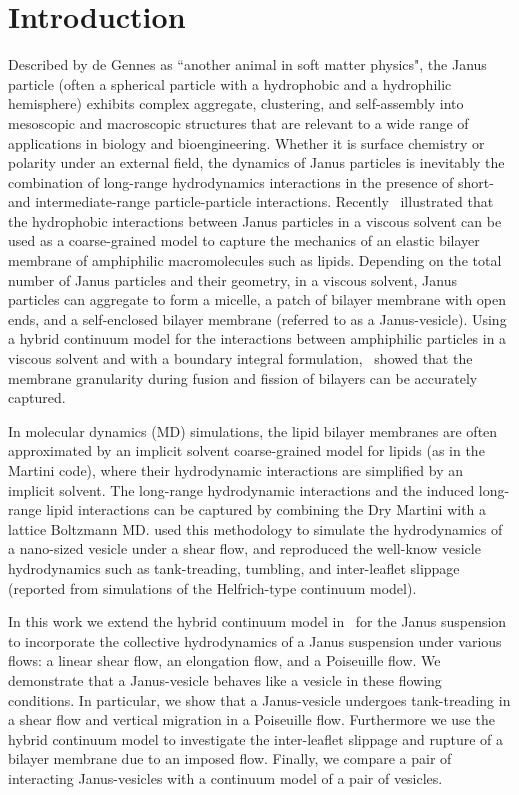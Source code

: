 \documentclass[lineno]{jfm}
\begin{document}
\section{\label{intro}Introduction}
Described by de Gennes as ``another animal in soft matter physics", the
Janus particle (often a spherical particle with a hydrophobic and a
hydrophilic hemisphere) exhibits complex aggregate, clustering, and
self-assembly into mesoscopic and macroscopic structures that are
relevant to a wide range of applications in biology and bioengineering.
Whether it is surface chemistry or polarity under an external field, the
dynamics of Janus particles is inevitably the combination of long-range
hydrodynamics interactions in the presence of short- and
intermediate-range particle-particle interactions. Recently~\cite{Fu20}
illustrated that the hydrophobic interactions between Janus particles in
a viscous solvent can be used as a coarse-grained model to capture the
mechanics of an elastic bilayer membrane of amphiphilic macromolecules
such as lipids. Depending on the total number of Janus particles and
their geometry, in a viscous solvent, Janus particles can aggregate to
form a micelle, a patch of bilayer membrane with open ends, and a
self-enclosed bilayer membrane (referred to as a Janus-vesicle). Using a
hybrid continuum model for the interactions between amphiphilic
particles in a viscous solvent and with a boundary integral
formulation,~\cite{Fu20} showed that the membrane granularity during
fusion and fission of bilayers can be accurately captured. 

In molecular dynamics (MD) simulations, the lipid bilayer membranes are
often approximated by an implicit solvent coarse-grained model for
lipids (as in the Martini code), where their hydrodynamic interactions
are simplified by an implicit solvent. The long-range hydrodynamic
interactions and the induced long-range lipid interactions can be
captured by combining the Dry Martini with a lattice Boltzmann MD.
\cite{Brandner2019} used this methodology to simulate the hydrodynamics
of a nano-sized vesicle under a shear flow, and reproduced the well-know
vesicle hydrodynamics such as tank-treading, tumbling, and inter-leaflet
slippage (reported from simulations of the Helfrich-type continuum
model).

In this work we extend the hybrid continuum model in~\cite{Fu20} for the
Janus suspension to incorporate the collective hydrodynamics of a Janus
suspension under various flows: a linear shear flow, an elongation flow,
and a Poiseuille flow. We demonstrate that a Janus-vesicle behaves like
a vesicle in these flowing conditions. In particular, we show that a
Janus-vesicle undergoes tank-treading in a shear flow and vertical
migration in a Poiseuille flow. Furthermore we use the hybrid continuum
model to investigate the inter-leaflet slippage and rupture of a bilayer
membrane due to an imposed flow. Finally, we compare a pair of
interacting Janus-vesicles with a continuum model of a pair of vesicles.
\end{document}
